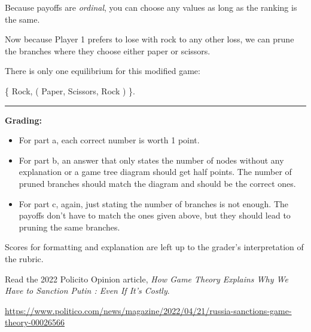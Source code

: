 \documentclass[addpoints]{exam}
\begin{document}
\begin{questions}
\begin{solution}
\begin{parts}
  Because payoffs are \textit{ordinal}, 
  you can choose any values as long as the ranking is the same.
  
  \begin{center}
    
  \end{center}

  Now because Player 1 prefers to lose with rock to any other loss, 
  we can prune the branches where they choose either 
  paper or scissors.
  
  There is only one equilibrium for this modified game:
  
  \{ 
  {\color{red} Rock}, 
  (
  {\color{blue} Paper},
  {\color{blue} Scissors},
  {\color{blue} Rock}
  ) \}.

  \noindent\rule[0.5ex]{\linewidth}{1pt}
   
  \textbf{Grading:}

  \begin{itemize}
  \item 
  For part a, each correct number is worth 1 point.

  \item
  For part b, an answer that only states the number of nodes without any explanation or a game tree diagram 
  should get half points.
  The number of pruned branches should match the diagram and should be the correct ones.

  \item
  For part c, again, just stating the number of branches is not enough. 
  The payoffs don't have to match the ones given above, but they should lead to pruning the same branches. 
  
  \end{itemize}

  Scores for formatting and explanation are left up to the grader's interpretation of the rubric.

\end{parts}
\end{solution}

\newpage


\question%

Read the 2022 Policito Opinion article, 
\textit{How Game Theory Explains Why We Have to Sanction Putin : Even If It’s Costly}.

\url{https://www.politico.com/news/magazine/2022/04/21/russia-sanctions-game-theory-00026566}


\end{questions}
\end{document}
